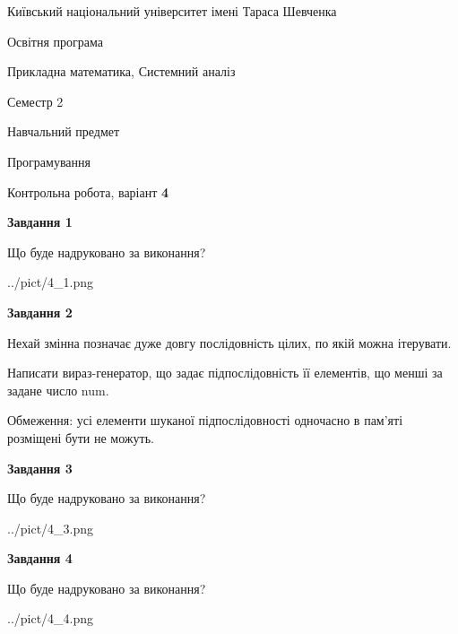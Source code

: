 \documentclass[12pt, ukrainian]{article}
\begin{document}
{{\begin {small}\par
{ \center  Київський національний університет імені Тараса Шевченка \par}
{\parbox {5 cm}{Освітня програма \hfill}{\parbox {8 cm}{Прикладна математика, Системний аналіз \hfill}}\parbox {5 cm}{\hfill Семестр 2}}\par
{\parbox {5 cm} {Навчальний предмет \hfill}\parbox {7 cm}{Програмування \hfill}\parbox {6cm}{\hfill}\par}\vspace{-7pt} \end{small}}{\center Контрольна робота, варіант  \No \textbf
{ 4 }\par}}
{
\begin {large}
{\begin {center}\textbf{Завдання 1}\end {center}}\par
Що буде надруковано за виконання?\par\par
\begin{center}
	{../pict/4_1.png}
\end{center}
\newpage

{\begin {center}\textbf{Завдання 2}\end {center}}\par
Нехай змінна  позначає дуже довгу послідовність цілих, по якій можна ітерувати.

Написати вираз-генератор, що задає підпослідовність її елементів, що менші за задане число num.

Обмеження: усі елементи шуканої підпослідовності одночасно в пам'яті розміщені бути не можуть.\par
\newpage

{\begin {center}\textbf{Завдання 3}\end {center}}\par
Що буде надруковано за виконання?
\begin{center}
	{../pict/4_3.png}
\end{center}
\newpage

{\begin {center}\textbf{Завдання 4}\end {center}}\par
Що буде надруковано за виконання?\par
\begin{center}
	{../pict/4_4.png}
\end{center}
\newpage


\end{large}}
\end{document}
